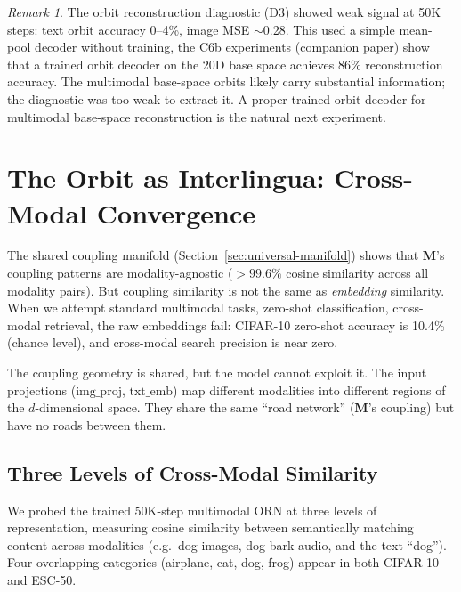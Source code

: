 \documentclass[11pt, a4paper]{article}
\newcommand{\M}{\mathbf{M}}
\theoremstyle{plain}
\theoremstyle{remark}
\newtheorem*{remark}{Remark}
\begin{document}
\begin{remark}
The orbit reconstruction diagnostic (D3) showed weak signal at 50K steps: text orbit accuracy 0--4\%, image MSE $\sim$0.28.
This used a simple mean-pool decoder without training, the C6b experiments (companion paper) show that a trained orbit decoder on the 20D base space achieves 86\% reconstruction accuracy.
The multimodal base-space orbits likely carry substantial information; the diagnostic was too weak to extract it.
A proper trained orbit decoder for multimodal base-space reconstruction is the natural next experiment.
\end{remark}

\section{The Orbit as Interlingua: Cross-Modal Convergence}
\label{sec:orbit-interlingua}

The shared coupling manifold (Section~\ref{sec:universal-manifold}) shows that $\M$'s coupling patterns are modality-agnostic ($> 99.6\%$ cosine similarity across all modality pairs).
But coupling similarity is not the same as \emph{embedding} similarity.
When we attempt standard multimodal tasks, zero-shot classification, cross-modal retrieval, the raw embeddings fail: CIFAR-10 zero-shot accuracy is 10.4\% (chance level), and cross-modal search precision is near zero.

The coupling geometry is shared, but the model cannot exploit it.
The input projections ($\text{img\_proj}$, $\text{txt\_emb}$) map different modalities into different regions of the $d$-dimensional space.
They share the same ``road network'' ($\M$'s coupling) but have no roads between them.

\subsection{Three Levels of Cross-Modal Similarity}

We probed the trained 50K-step multimodal ORN at three levels of representation, measuring cosine similarity between semantically matching content across modalities (e.g.\ dog images, dog bark audio, and the text ``dog'').
Four overlapping categories (airplane, cat, dog, frog) appear in both CIFAR-10 and ESC-50.
\end{document}
